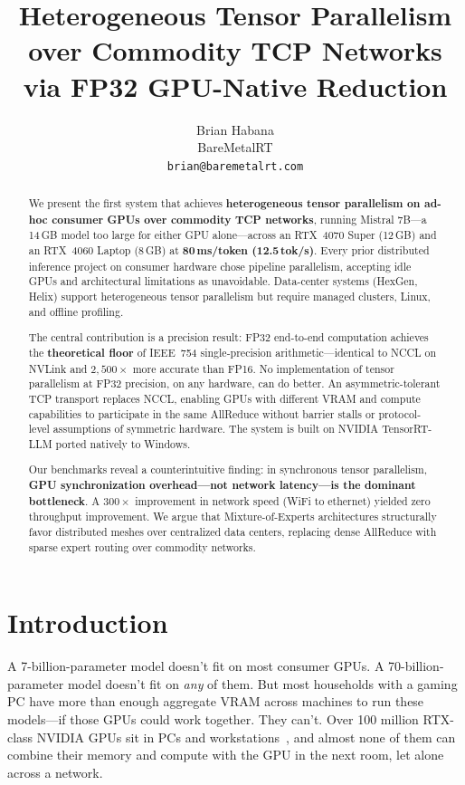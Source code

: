 \documentclass[10pt,twocolumn]{article}
\title{Heterogeneous Tensor Parallelism over Commodity TCP Networks\\via FP32 GPU-Native Reduction}
\author{Brian Habana\\
  BareMetalRT\\
  \texttt{brian@baremetalrt.com}}
\date{}
\begin{document}
\maketitle

\begin{abstract}
We present the first system that achieves \textbf{heterogeneous tensor
parallelism on ad-hoc consumer GPUs over commodity TCP networks}, running
Mistral 7B---a 14\,GB model too large for either GPU alone---across an
RTX~4070 Super (12\,GB) and an RTX~4060 Laptop (8\,GB) at
\textbf{80\,ms/token (12.5\,tok/s)}.  Every prior distributed inference
project on consumer hardware chose pipeline parallelism, accepting idle
GPUs and architectural limitations as unavoidable.  Data-center systems
(HexGen, Helix) support heterogeneous tensor parallelism but require
managed clusters, Linux, and offline profiling.

The central contribution is a precision result: FP32 end-to-end computation
achieves the \textbf{theoretical floor} of IEEE~754 single-precision
arithmetic---identical to NCCL on NVLink and $2{,}500\times$ more accurate
than FP16.  No implementation of tensor parallelism at FP32 precision, on
any hardware, can do better.  An
asymmetric-tolerant TCP transport replaces NCCL, enabling GPUs with
different VRAM and compute capabilities to participate in the same
AllReduce without barrier stalls or protocol-level assumptions of symmetric
hardware.  The system is built on NVIDIA TensorRT-LLM ported natively to
Windows.

Our benchmarks reveal a counterintuitive finding: in synchronous tensor
parallelism, \textbf{GPU synchronization overhead---not network
latency---is the dominant bottleneck}.  A $300\times$ improvement in
network speed (WiFi to ethernet) yielded zero throughput improvement.  We
argue that Mixture-of-Experts architectures structurally favor distributed
meshes over centralized data centers, replacing dense AllReduce with sparse
expert routing over commodity networks.
\end{abstract}

\section{Introduction}\label{sec:intro}

A 7-billion-parameter model doesn't fit on most consumer GPUs.
A 70-billion-parameter model doesn't fit on \emph{any} of them.
But most households with a gaming PC have more than enough aggregate VRAM
across machines to run these models---if those GPUs could work together.
They can't.  Over 100 million RTX-class NVIDIA GPUs sit in PCs and
workstations~\citep{nvidia2024rtx}, and almost none of them can combine
their memory and compute with the GPU in the next room, let alone across a
network.
\end{document}
